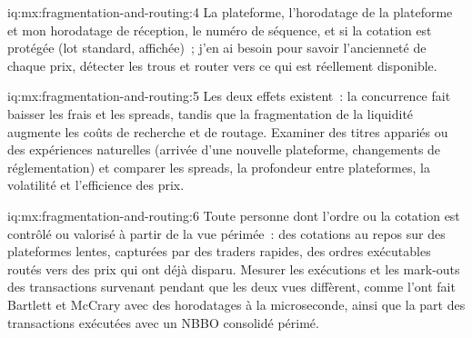 \begin{solution}{iq:mx:fragmentation-and-routing:4}
La plateforme, l'horodatage de la plateforme et mon horodatage de réception, le numéro de séquence, et si la cotation est protégée (lot standard, affichée)~; j'en ai besoin
pour savoir l'ancienneté de chaque prix, détecter les trous et router vers ce qui est réellement disponible.
\end{solution}

\begin{solution}{iq:mx:fragmentation-and-routing:5}
Les deux effets existent~: la concurrence fait baisser les frais et les spreads, tandis que la fragmentation de la liquidité augmente les coûts de recherche et de routage. Examiner des titres appariés ou des expériences naturelles
(arrivée d'une nouvelle plateforme, changements de réglementation) et comparer les spreads, la profondeur entre plateformes, la volatilité et l'efficience des prix.
\end{solution}

\begin{solution}{iq:mx:fragmentation-and-routing:6}
Toute personne dont l'ordre ou la cotation est contrôlé ou valorisé à partir de la vue périmée~: des cotations au repos sur des plateformes lentes, capturées par des traders rapides, des ordres exécutables
routés vers des prix qui ont déjà disparu. Mesurer les exécutions et les mark-outs des transactions survenant pendant que les deux vues diffèrent, comme l'ont fait Bartlett et McCrary
avec des horodatages à la microseconde, ainsi que la part des transactions exécutées avec un NBBO consolidé périmé.
\end{solution}
